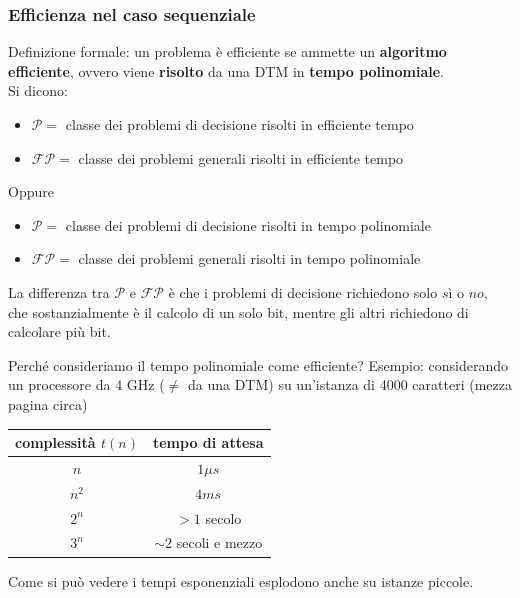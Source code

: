 \documentclass[11pt]{article}
\begin{document}
	\subsubsection*{Efficienza nel caso sequenziale}
	
	Definizione formale: un problema è efficiente se ammette un \textbf{algoritmo efficiente}, ovvero viene \textbf{risolto} da una DTM in \textbf{tempo polinomiale}.\\
	
	Si dicono:
	\begin{itemize}
		\item $\mathcal{P} =$ classe dei problemi di decisione risolti in efficiente tempo
		\item $\mathcal{FP} =$ classe dei problemi generali risolti in efficiente tempo
	\end{itemize}
	Oppure
	\begin{itemize}
		\item $\mathcal{P} =$ classe dei problemi di decisione risolti in tempo polinomiale
		\item $\mathcal{FP} =$ classe dei problemi generali risolti in tempo polinomiale
	\end{itemize}
	
	La differenza tra $\mathcal{P}$ e $\mathcal{FP}$ è che i problemi di decisione richiedono solo $sì$ o $no$, che sostanzialmente è il calcolo di un solo bit, mentre gli altri richiedono di calcolare più bit.\\
	
	\newpage
	
	Perché consideriamo il tempo polinomiale come efficiente? Esempio: considerando un processore da $4$ GHz ($\neq$ da una DTM) su un'istanza di 4000 caratteri (mezza pagina circa)
	\begin{center}
		\begin{tabular}{c | c}
			complessità $t(n)$ & tempo di attesa \\
			\hline
			$n$ & $1\mu s$ \\
			$n^2$ & $4 ms$ \\
			$2^n$ & $> 1$ secolo \\
			$3^n$ & $\sim 2$ secoli e mezzo \\
		\end{tabular}
	\end{center}
	
	
	Come si può vedere i tempi esponenziali esplodono anche su istanze piccole.\\
	
\end{document}
